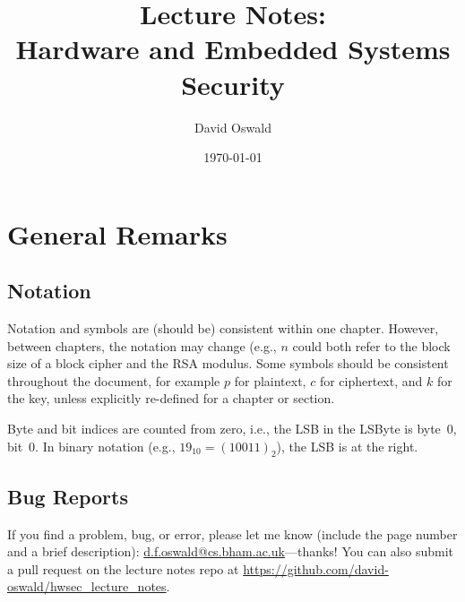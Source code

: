 \documentclass[draft=false,           %
               paper=a4,              %
               fontsize=11pt,         %
               headings=big,
               twocolumn=false,       %
               twoside,               %
               openright,             %
               chapterprefix,         %
               cleardoublepage=plain, %
               parskip=false,
               numbers=noenddot        %
              ]{scrbook}
\title{
Lecture Notes:\\
Hardware and Embedded Systems Security
}
\author{David Oswald}
\date{\today}
\begin{document}
  


\maketitle

%

% 

\def\contentsname{Table of Contents}
\tableofcontents

\cleardoublepage
\chapter*{General Remarks}
\section*{Notation}
Notation and symbols are (should be) consistent within one chapter. However, between chapters, the notation may change (e.g., $n$ could both refer to the block size of a block cipher and the \ac{RSA} modulus. Some symbols should be consistent throughout the document, for example $p$ for plaintext, $c$ for ciphertext, and $k$ for the key, unless explicitly re-defined for a chapter or section.

Byte and bit indices are counted from zero, i.e., the \ac{LSB} in the \ac{LSByte} is byte~0, bit~0. In binary notation (e.g., $19_{10} = \left(10011\right)_2$), the \ac{LSB} is at the right.

\section*{Bug Reports}
If you find a problem, bug, or error, please let me know (include the page number and a brief description): \href{mailto:d.f.oswald@cs.bham.ac.uk}{d.f.oswald@cs.bham.ac.uk}---thanks! You can also submit a pull request on the lecture notes repo at \url{https://github.com/david-oswald/hwsec_lecture_notes}.
\end{document}
